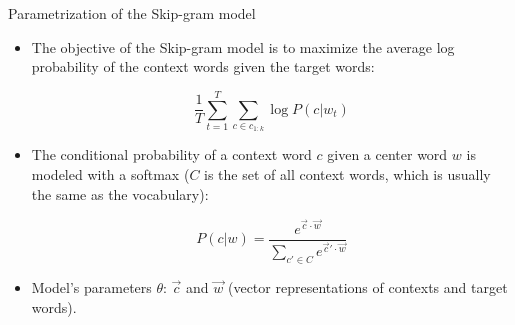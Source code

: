 \documentclass[handout]{beamer}
\begin{document}
\begin{frame}{Parametrization of the Skip-gram model}
\begin{scriptsize}
\begin{itemize}

\item The objective of the Skip-gram model is to maximize the average log probability of the context words given the target words:

\begin{displaymath}
 \frac{1}{T} \sum_{t=1}^T \sum_{c \in c_{1:k}}  \log P(c|w_t)
\end{displaymath}


\item The conditional probability of a context word $c$ given a center word $w$ is modeled with a softmax ($C$ is the set of all context words, which is usually the same as the vocabulary):


\begin{displaymath}
P(c|w) = \frac{e^{\vec{c}\cdot \vec{w}}}{ \sum_{c'\in C} e^{\vec{c}'\cdot \vec{w}}}
\end{displaymath}

\item Model's parameters $\theta$: $\vec{c}$ and $\vec{w}$ (vector representations of contexts and target words).

\end{itemize}
\end{scriptsize}
\end{frame}
\end{document}
